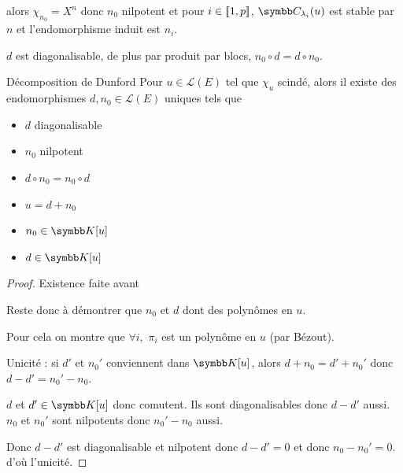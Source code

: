 alors $\chi_{n_0} = X^n$ donc $n_0$ nilpotent et pour $i \in [\![1, p]\!]$, 
$\C_{\lambda_i}(u)$ est stable par $n$ et l'endomorphisme induit est 
$n_i$. 

$d$ est diagonalisable, de plus par produit par blocs, 
$n_0 \circ d = d \circ n_0$. 



\begin{theoreme}{Décomposition de Dunford}{}
    Pour $u \in \mathscr L(E)$ tel que $\chi_u$ scindé, alors il existe des endomorphismes 
    $d, n_0 \in \mathscr L(E)$ uniques tels que 
    \begin{itemize}
        \item $d$ diagonalisable
        \item $n_0$ nilpotent
        \item $d \circ n_0 = n_0 \circ d$
        \item $u = d + n_0$
        \item $n_0 \in \K[u]$
        \item $d \in \K[u]$
    \end{itemize}
\end{theoreme}

\begin{proof}
    Existence faite avant 

    Reste donc à démontrer que $n_0$ et $d$ dont des polynômes en $u$.

    Pour cela on montre que $\forall i, $ $\pi_i$ est un polynôme en $u$ 
    (par Bézout). 

    \avspace Unicité : si $d'$ et $n_0'$ conviennent dans $\K[u]$, alors 
    $d + n_0 = d' + n_0'$ donc $d - d' = n_0' - n_0$.

    $d$ et $d' \in \K[u]$ donc comutent. Ils sont diagonalisables donc $d - d'$ aussi.
    $n_0$ et $n_0'$ sont nilpotents donc $n_0' - n_0$ aussi.

    Donc $d - d'$ est diagonalisable et nilpotent donc $d - d' = 0$ et donc $n_0 - n_0' = 0$.
    d'où l'unicité.
\end{proof}

